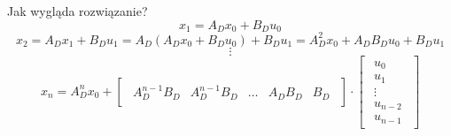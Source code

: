 \documentclass{article}
\begin{document}
        Jak wygląda rozwiązanie?
        $$
            x_{1} = A_{D}x_{0} + B_{D}u_{0}
        $$
        $$
            x_{2}
            =
            A_{D}x_{1} + B_{D}u_{1}
            =
            A_{D}\left( A_{D}x_{0} + B_{D}u_{0} \right) + B_{D}u_{1}
            =
            A_{D}^{2}x_{0} + A_{D}B_{D}u_{0} + B_{D}u_{1}
        $$
        $$
            \vdots
        $$
        $$
            x_{n} = A_{D}^{n}x_{0}
            +
            \begin{bmatrix}
                \begin{array}{ccccc}
                    A_{D}^{n-1}B_{D} & A_{D}^{n-1}B_{D} & \dots & A_{D}B_{D}    & B_{D}
                \end{array}
            \end{bmatrix}
            \cdot
            \begin{bmatrix}
                \begin{array}{c}
                    u_{0}\\ u_{1}\\ \vdots\\    u_{n-2}\\ u_{n-1}
                \end{array}
            \end{bmatrix}
        $$
\end{document}
